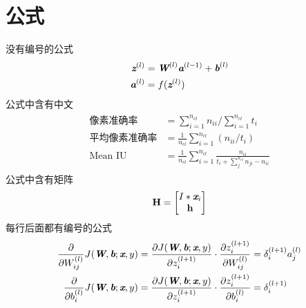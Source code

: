\section{公式}
\label{sec:formula}
没有编号的公式
\begin{align*}
\begin{split}
    \label{eq:feedforward}
    \textit{\textbf{z}}^{(l)} & = \textit{\textbf{W}}^{(l)}\textit{\textbf{a}}^{(l-1)} + \textit{\textbf{b}}^{(l)} \\
    \textit{\textbf{a}}^{(l)} & = f(\textit{\textbf{z}}^{(l)})
\end{split}
\end{align*}
公式中含有中文
\begin{align}
    \begin{split}
    \mbox{像素准确率} &= \sum_{i=1}^{n_{cl}}n_{ii} / \sum_{i=1}^{n_{cl}}t_i \\
        \mbox{平均像素准确率} &= \frac{1}{n_{cl}} \sum_{i=1}^{n_{cl}}(n_{ii}/ t_i) \\
    \mbox{Mean IU} &= \frac{1}{n_{cl}} \sum_{i=1}^{n_{cl}}\frac{n_{ii}}{t_i + \sum_j^{n_{cl}} n_{ji} - n_{ii}}
    \end{split}
\end{align}
公式中含有矩阵
\begin{equation}
    \textbf{H} = \begin{bmatrix}
        I*\textit{\textbf{x}}_i \\ \textbf{h}
    \end{bmatrix}
\end{equation}
每行后面都有编号的公式
\begin{align}
    \frac{\partial}{\partial W_{ij}^{(l)}} J(\textit{\textbf{W}},\textit{\textbf{b}};\textit{\textbf{x}},y) &= \frac{\partial J(\textit{\textbf{W}},\textit{\textbf{b}};\textit{\textbf{x}},y)}{\partial z_i^{(l+1)}}\cdot \frac{\partial z_i^{(l+1)}}{\partial W_{ij}^{(l)}} = \delta_i^{(l+1)}a_j^{(l)} \\
    \frac{\partial}{\partial b_i^{(l)}} J(\textit{\textbf{W}},\textit{\textbf{b}};\textit{\textbf{x}},y) &= \frac{\partial J(\textit{\textbf{W}},\textit{\textbf{b}};\textit{\textbf{x}},y)}{\partial z_i^{(l+1)}}\cdot \frac{\partial z_i^{(l+1)}}{\partial b_i^{(l)}} = \delta_i^{(l+1)}
\end{align}


